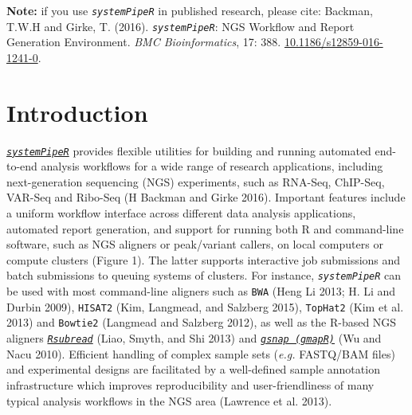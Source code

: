 \documentclass[14pt,]{article}
\author{Author: Daniela Cassol (danielac@ucr.edu) and Thomas Girke (thomas.girke@ucr.edu)}
\date{Last update: 28 January, 2021}
\begin{document}
\maketitle


{
\setcounter{tocdepth}{2}
\tableofcontents
\newpage
}
\textbf{Note:} if you use \emph{\texttt{systemPipeR}} in published research, please cite:
Backman, T.W.H and Girke, T. (2016). \emph{\texttt{systemPipeR}}: NGS Workflow and Report Generation Environment. \emph{BMC Bioinformatics}, 17: 388. \href{https://doi.org/10.1186/s12859-016-1241-0}{10.1186/s12859-016-1241-0}.

\hypertarget{introduction}{%
\section{Introduction}\label{introduction}}

\href{http://www.bioconductor.org/packages/devel/bioc/html/systemPipeR.html}{\emph{\texttt{systemPipeR}}} provides flexible utilities for building and running automated end-to-end analysis workflows for a wide range of research applications, including next-generation sequencing (NGS) experiments, such as RNA-Seq, ChIP-Seq, VAR-Seq and Ribo-Seq (H Backman and Girke 2016). Important features include a uniform workflow interface across different data analysis applications, automated report generation, and support for running both R and command-line software, such as NGS aligners or peak/variant callers, on local computers or compute clusters (Figure 1). The latter supports interactive job submissions and batch submissions to queuing systems of clusters. For instance, \emph{\texttt{systemPipeR}} can be used with most command-line aligners such as \texttt{BWA} (Heng Li 2013; H. Li and Durbin 2009), \texttt{HISAT2} (Kim, Langmead, and Salzberg 2015), \texttt{TopHat2} (Kim et al. 2013) and \texttt{Bowtie2} (Langmead and Salzberg 2012), as well as the R-based NGS aligners \href{http://www.bioconductor.org/packages/devel/bioc/html/Rsubread.html}{\emph{\texttt{Rsubread}}} (Liao, Smyth, and Shi 2013) and \href{http://www.bioconductor.org/packages/devel/bioc/html/gmapR.html}{\emph{\texttt{gsnap (gmapR)}}} (Wu and Nacu 2010). Efficient handling of complex sample sets (\emph{e.g.} FASTQ/BAM files) and experimental designs are facilitated by a well-defined sample annotation infrastructure which improves reproducibility and user-friendliness of many typical analysis workflows in the NGS area (Lawrence et al. 2013).
\end{document}
